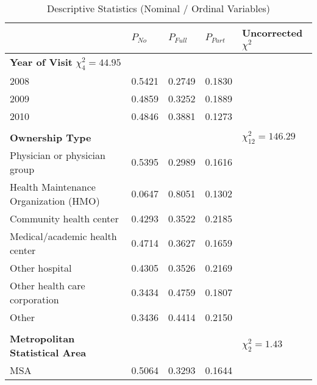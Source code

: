 \documentclass[11pt, oneside]{article}        %
\begin{document}
\begin{table}[h]
\footnotesize 
\centering
\caption{Descriptive Statistics (Nominal / Ordinal Variables)}

\label{tab:desc1}
\begin{tabular}{@{}lllll@{}}
\toprule
                                       & $P_{No}$ & $P_{Full}$ & $P_{Part}$ & Uncorrected $\chi^2$   \\ \midrule
\textbf{Year of Visit} $\chi^2_4 = 44.95$                 &          &            &            &      \\
2008                                   & 0.5421   & 0.2749     & 0.1830     &                        \\
2009                                   & 0.4859   & 0.3252     & 0.1889     &                        \\
2010                                   & 0.4846   & 0.3881     & 0.1273     &                        \\
                                       &          &            &            &                        \\
\textbf{Ownership Type}                &          &            &            & $\chi^2_{12} = 146.29$ \\
Physician or physician group           & 0.5395   & 0.2989     & 0.1616     &                        \\
Health Maintenance Organization (HMO)  & 0.0647   & 0.8051     & 0.1302     &                        \\
Community health center                & 0.4293   & 0.3522     & 0.2185     &                        \\
Medical/academic health center         & 0.4714   & 0.3627     & 0.1659     &                        \\
Other hospital                         & 0.4305   & 0.3526     & 0.2169     &                        \\
Other health care corporation          & 0.3434   & 0.4759     & 0.1807     &                        \\
Other                                  & 0.3436   & 0.4414     & 0.2150     &                        \\
                                       &          &            &            &                        \\
\textbf{Metropolitan Statistical Area} &          &            &            & $\chi^2_2 = 1.43$      \\
MSA                                    & 0.5064   & 0.3293     & 0.1644     &                        \\

\end{tabular}
\end{table}
\end{document}
